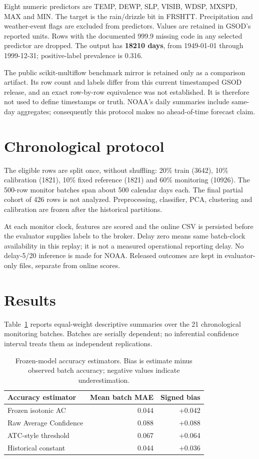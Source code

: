 \documentclass[10pt,a4paper]{article}
\begin{document}
Eight numeric predictors are TEMP, DEWP, SLP, VISIB, WDSP, MXSPD, MAX and MIN. The target is the rain/drizzle bit in FRSHTT. Precipitation and weather-event flags are excluded from predictors. Values are retained in GSOD's reported units. Rows with the documented 999.9 missing code in any selected predictor are dropped. The output has \textbf{18210 days}, from 1949-01-01 through 1999-12-31; positive-label prevalence is 0.316.

The public scikit-multiflow benchmark mirror is retained only as a comparison artifact. Its row count and labels differ from this current timestamped GSOD release, and an exact row-by-row equivalence was not established. It is therefore not used to define timestamps or truth. NOAA's daily summaries include same-day aggregates; consequently this protocol makes no ahead-of-time forecast claim.

\section{Chronological protocol}
The eligible rows are split once, without shuffling: 20\% train (3642), 10\% calibration (1821), 10\% fixed reference (1821) and 60\% monitoring (10926). The 500-row monitor batches span about 500 calendar days each. The final partial cohort of 426 rows is not analyzed. Preprocessing, classifier, PCA, clustering and calibration are frozen after the historical partitions.

At each monitor clock, features are scored and the online CSV is persisted before the evaluator supplies labels to the broker. Delay zero means same batch-clock availability in this replay; it is not a measured operational reporting delay. No delay-5/20 inference is made for NOAA. Released outcomes are kept in evaluator-only files, separate from online scores.

\section{Results}
Table~\ref{tab:estimators} reports equal-weight descriptive summaries over the 21 chronological monitoring batches. Batches are serially dependent; no inferential confidence interval treats them as independent replications.
\begin{table}[ht]
\centering\small\begin{tabular}{lrr}\toprule
Accuracy estimator & Mean batch MAE & Signed bias \\\midrule
Frozen isotonic AC & 0.044 & +0.042 \\
Raw Average Confidence & 0.088 & +0.088 \\
ATC-style threshold & 0.067 & +0.064 \\
Historical constant & 0.044 & +0.036 \\\bottomrule\end{tabular}
\caption{Frozen-model accuracy estimators. Bias is estimate minus observed batch accuracy; negative values indicate underestimation.}\label{tab:estimators}
\end{table}
\end{document}
